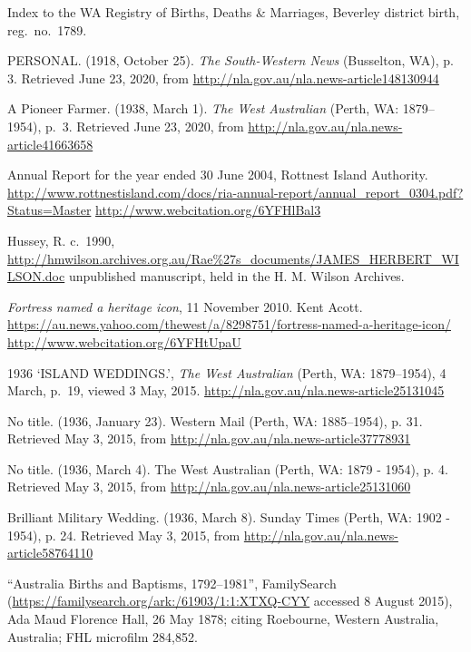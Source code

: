 \begin{thebibliography}{999}
	Index to the WA Registry of Births, Deaths \& Marriages, Beverley district birth, reg.~no.~1789.

	PERSONAL. (1918, October 25). \emph{The South-Western News} (Busselton, WA), p. 3.
	Retrieved June 23, 2020, from \url{http://nla.gov.au/nla.news-article148130944}

	A Pioneer Farmer. (1938, March 1). \emph{The West Australian} (Perth, WA: 1879--1954), p.\ 3.
	Retrieved June 23, 2020, from \url{http://nla.gov.au/nla.news-article41663658}

	Annual Report for the year ended 30 June 2004, Rottnest Island Authority.
	\url{http://www.rottnestisland.com/docs/ria-annual-report/annual_report_0304.pdf?Status=Master}
	\url{http://www.webcitation.org/6YFHlBal3}

	Hussey, R. c.~1990, \url{http://hmwilson.archives.org.au/Rae\%27s_documents/JAMES_HERBERT_WILSON.doc}
	unpublished manuscript, held in the  H. M. Wilson Archives.

	\emph{Fortress named a heritage icon}, 11 November 2010. Kent Acott.
	\url{https://au.news.yahoo.com/thewest/a/8298751/fortress-named-a-heritage-icon/}
	\url{http://www.webcitation.org/6YFHtUpaU}

	1936 `ISLAND WEDDINGS.', \emph{The West Australian} (Perth, WA: 1879--1954), 4 March, p.\ 19, viewed 3 May, 2015.
	\url{http://nla.gov.au/nla.news-article25131045}

	No title. (1936, January 23). Western Mail (Perth, WA: 1885--1954), p. 31. Retrieved May 3, 2015,
	from \url{http://nla.gov.au/nla.news-article37778931}

	No title. (1936, March 4). The West Australian (Perth, WA: 1879 - 1954), p. 4.
	Retrieved May 3, 2015, from \url{http://nla.gov.au/nla.news-article25131060}

	Brilliant Military Wedding. (1936, March 8). Sunday Times (Perth, WA: 1902 - 1954), p. 24.
	Retrieved May 3, 2015, from \url{http://nla.gov.au/nla.news-article58764110}

	``Australia Births and Baptisms, 1792--1981'', FamilySearch
	(\url{https://familysearch.org/ark:/61903/1:1:XTXQ-CYY} accessed 8 August 2015),
	Ada Maud Florence Hall, 26 May 1878; citing Roebourne, Western Australia, Australia;
	FHL microfilm 284,852.


\end{thebibliography}
